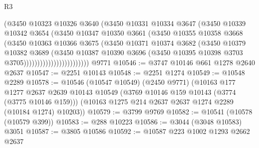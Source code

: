 \begin{lexlean}{R3}
\begin{coremodule}
                                (@3450
                                  @10323
                                  @10326
                                  @3640
                                  (@3450
                                    @10331
                                    @10334
                                    @3647
                                    (@3450
                                      @10339
                                      @10342
                                      @3654
                                      (@3450
                                        @10347
                                        @10350
                                        @3661
                                        (@3450
                                          @10355
                                          @10358
                                          @3668
                                          (@3450
                                            @10363
                                            @10366
                                            @3675
                                            (@3450
                                              @10371
                                              @10374
                                              @3682
                                              (@3450
                                                @10379
                                                @10382
                                                @3689
                                                (@3450
                                                  @10387
                                                  @10390
                                                  @3696
                                                  (@3450
                                                    @10395
                                                    @10398
                                                    @3703
                                                    @3705))))))))))))))))))))))))
    @9771
@10546 := @3747 @10146 @661 @1278 @2640 @2637
@10547 := @2251 @10143
@10548 := @2251 @1274
@10549 := @10548 @2289
@10578 := @10546
    (@10547 @10549)
    (@2450 @9771)
    (@10163
      @177
      @1277
      @2637
      @2639
      @10143
      @10549
      (@3769 @10146 @159 @10143 (@3774 (@3775 @10146 @159)))
      (@10163 @1275 @214 @2637 @2637 @1274 @2289 (@10184 @1274) @10203))
@10579 := @3799 @9769
@10582 := @10541 (@10578 (@10579 @399))
@10583 := @288 @10223
@10586 := @3044 (@3048 @10583) @3051
@10587 := @3805 @10586
@10592 := @10587 @223 @1002 @1293 @2662 @2637

\end{coremodule}
\end{lexlean}
